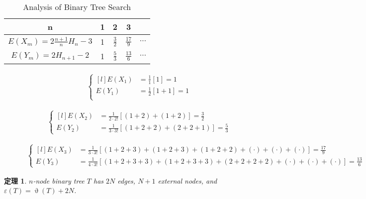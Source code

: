 \documentclass[11pt,fleqn]{article}
\newtheorem{theorem}{定理}
\begin{document}
\begin{table}[!hb]
	\centering
	\caption{Analysis of Binary Tree Search}
	\label{bst}
	\begin{tabular}{|c | c | c | c | c|}
		\hline
		n & 1 & 2 & 3 &
		\\ \hline
		$E(X_m) = 2 \frac{n+1}{n} H_n - 3$ & 1 & $\frac{3}{2}$ & $\frac{17}{9}$ & $\cdots$ 
		\\ \hline
		$E(Y_m) = 2 H_{n+1} - 2$ & 1 & $\frac{5}{3}$ & $\frac{13}{6}$ & $\cdots$ 
		\\ \hline
	\end{tabular}
\end{table}

\begin{description}
	\item[]
		
		\begin{align*}
			\left\{\begin{matrix*}[l]
				E(X_1) &= \frac{1}{1} \left[1\right] = 1 \\
				E(Y_1) &= \frac{1}{2} \left[1+1\right] = 1 \\
			\end{matrix*}\right.
		\end{align*}
	\item[]
		
		\begin{align*}
			\left\{\begin{matrix*}[l]
				E(X_2) &= \frac{1}{2 \cdot 2!} \left[(1+2) + (1+2)\right] 
						= \frac{3}{2} \\
				E(Y_2) &= \frac{1}{3 \cdot 3!} \left[(1+2+2) + (2+2+1)\right] 
						= \frac{5}{3}
			\end{matrix*}\right.
		\end{align*}
	\item[]
		
		\begin{align*}
			\left\{\begin{matrix*}[l]
				E(X_3) &= \frac{1}{3 \cdot 3!} \left[(1+2+3) + (1+2+3) +
							(1+2+2) + (\cdot) + (\cdot) + (\cdot) \right]
						= \frac{17}{9} \\
				E(Y_3) &= \frac{1}{4 \cdot 3!} \left[(1+2+3+3) + (1+2+3+3) +
							(2+2+2+2) + (\cdot) + (\cdot) + (\cdot) \right] 
						= \frac{13}{6}
			\end{matrix*}\right.
		\end{align*}
\end{description}

\begin{theorem}
$n$-node binary tree $T$ has $2N$ edges, $N+1$ external nodes, and $\varepsilon(T)=\upvartheta(T)+2N$. 
\end{theorem}
\end{document}

